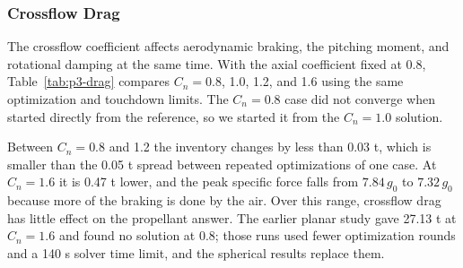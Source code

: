 \subsubsection{Crossflow Drag}
The crossflow coefficient affects aerodynamic braking, the pitching moment, and rotational damping at the same time. With the axial coefficient fixed at 0.8, Table~\ref{tab:p3-drag} compares $C_n=0.8$, 1.0, 1.2, and 1.6 using the same optimization and touchdown limits. The $C_n=0.8$ case did not converge when started directly from the reference, so we started it from the $C_n=1.0$ solution.

Between $C_n=0.8$ and 1.2 the inventory changes by less than 0.03 t, which is smaller than the 0.05 t spread between repeated optimizations of one case. At $C_n=1.6$ it is 0.47 t lower, and the peak specific force falls from $7.84\,g_0$ to $7.32\,g_0$ because more of the braking is done by the air. Over this range, crossflow drag has little effect on the propellant answer. The earlier planar study gave 27.13 t at $C_n=1.6$ and found no solution at 0.8; those runs used fewer optimization rounds and a 140 s solver time limit, and the spherical results replace them.
